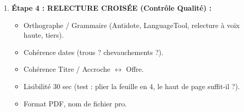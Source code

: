 \documentclass[11pt]{article}
\begin{document}
\begin{methode}
\begin{enumerate}
\begin{itemize}
                  \item \textbf{Reformuler :} Utiliser \textbf{le vocabulaire de l'offre} dans vos puces (ATS + Recruteur humain).
                  \item \textbf{Ordonner :} Mettre en \textbf{premier} (rubrique + premières puces) ce qui est \textbf{le plus pertinent} pour \emph{ce} poste.
                  \item \textbf{Quantifier :} Ajouter des chiffres (budget, effectif, \%, délai, volume, taux de réussite) là où c'est possible.
              \end{itemize}
        \item \textbf{Étape 4 : RELECTURE CROISÉE (Contrôle Qualité) :}
              \begin{itemize}
                  \item Orthographe / Grammaire (Antidote, LanguageTool, relecture à voix haute, tiers).
                  \item Cohérence dates (trous ? chevauchements ?).
                  \item Cohérence Titre / Accroche $\leftrightarrow$ Offre.
                  \item Lisibilité 30 sec (test : plier la feuille en 4, le haut de page suffit-il ?).
                  \item Format PDF, nom de fichier pro.
              \end{itemize}
    \end{enumerate}
\end{methode}
\end{document}
